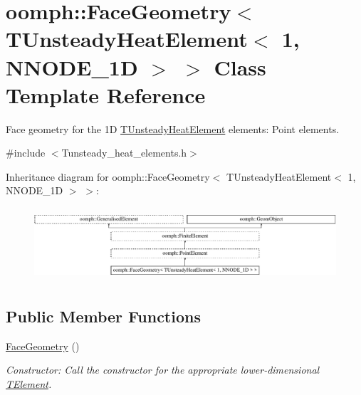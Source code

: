 \hypertarget{classoomph_1_1FaceGeometry_3_01TUnsteadyHeatElement_3_011_00_01NNODE__1D_01_4_01_4}{}\section{oomph\+:\+:Face\+Geometry$<$ T\+Unsteady\+Heat\+Element$<$ 1, N\+N\+O\+D\+E\+\_\+1D $>$ $>$ Class Template Reference}
\label{classoomph_1_1FaceGeometry_3_01TUnsteadyHeatElement_3_011_00_01NNODE__1D_01_4_01_4}


Face geometry for the 1D \hyperlink{classoomph_1_1TUnsteadyHeatElement}{T\+Unsteady\+Heat\+Element} elements\+: Point elements.  




{\ttfamily \#include $<$Tunsteady\+\_\+heat\+\_\+elements.\+h$>$}

Inheritance diagram for oomph\+:\+:Face\+Geometry$<$ T\+Unsteady\+Heat\+Element$<$ 1, N\+N\+O\+D\+E\+\_\+1D $>$ $>$\+:\begin{figure}[H]
\begin{center}
\leavevmode
\includegraphics[height=2.751843cm]{classoomph_1_1FaceGeometry_3_01TUnsteadyHeatElement_3_011_00_01NNODE__1D_01_4_01_4}
\end{center}
\end{figure}
\subsection*{Public Member Functions}
\begin{DoxyCompactItemize}
\item 
\hyperlink{classoomph_1_1FaceGeometry_3_01TUnsteadyHeatElement_3_011_00_01NNODE__1D_01_4_01_4_ab38443959b2c1d097897f4e35fefdde2}{Face\+Geometry} ()
\begin{DoxyCompactList}\small\item\em Constructor\+: Call the constructor for the appropriate lower-\/dimensional \hyperlink{classoomph_1_1TElement}{T\+Element}. \end{DoxyCompactList}\end{DoxyCompactItemize}
